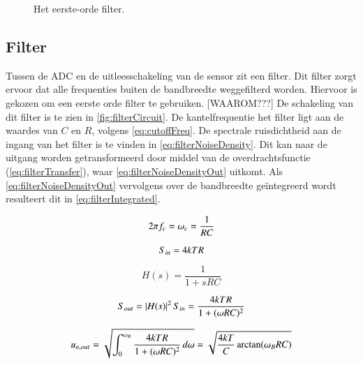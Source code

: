 \begin{figure}[ht]
    \centering
    \def\svgwidth{0.3\textwidth}
    
    \caption{Het eerste-orde filter.}
    \label{fig:filterCircuit}
\end{figure}

\subsection{Filter}
Tussen de ADC en de uitleesschakeling van de sensor zit een filter. Dit filter zorgt ervoor dat alle frequenties buiten de bandbreedte weggefilterd worden. Hiervoor is gekozen om een eerste orde filter te gebruiken. [WAAROM???]
De schakeling van dit filter is te zien in \autoref{fig:filterCircuit}. De kantelfrequentie het filter ligt aan de waardes van $C$ en $R$, volgens \autoref{eq:cutoffFreq}.
De spectrale ruisdichtheid aan de ingang van het filter is te vinden in \autoref{eq:filterNoiseDensity}.
Dit kan naar de uitgang worden getransformeerd door middel van de overdrachtsfunctie (\autoref{eq:filterTransfer}), waar \autoref{eq:filterNoiseDensityOut} uitkomt.
Als \autoref{eq:filterNoiseDensityOut} vervolgens over de bandbreedte geïntegreerd wordt resulteert dit in \autoref{eq:filterIntegrated}.

\begin{equation} \label{eq:cutoffFreq}
    2\pi f_c = \omega_c = \frac{1}{RC}
    \tagaddtext{[\si{\radian\per\second}]}
\end{equation}

\begin{equation} \label{eq:filterNoiseDensity}
    S_{in} = 4kTR
    \tagaddtext{[\si{\volt\squared\per\hertz}]}
\end{equation}

\begin{equation} \label{eq:filterTransfer}
    H(s) = \frac{1}{1+sRC}
\end{equation}

\begin{equation} \label{eq:filterNoiseDensityOut}
    S_{out} = \left|H(s)\right|^2S_{in} = \frac{4kTR}{1+(\omega R C)^2}
    \tagaddtext{[\si{\volt\squared\per\hertz}]}
\end{equation}

\begin{equation} \label{eq:filterIntegrated}
    u_{n,out} = \sqrt{\int_{0}^{\omega_B} \frac{4kTR}{1+(\omega R C)^2} \, d\omega} = \sqrt{\frac{4kT}{C} \arctan(\omega_BRC)}
    \tagaddtext{[\si{\volt}]}
\end{equation}

